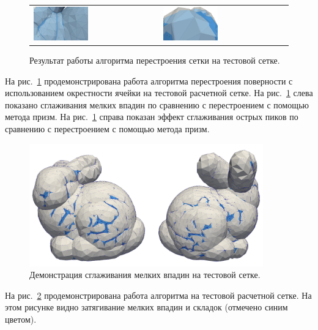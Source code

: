 \begin{figure}[ht]
\centering
\begin{tabular}{ll}
\includegraphics[width=0.45\textwidth]{./pics/text_1_remesh_common_envelope/pic_envelope_cave.png}
&
\includegraphics[width=0.45\textwidth]{./pics/text_1_remesh_common_envelope/pic_envelope_peak.png}
\end{tabular}
\singlespacing
{}\caption{Результат работы алгоритма перестроения сетки на тестовой сетке.}
\label{fig:text_1_remesh3_common_envelope_bunny}
\end{figure}

На рис.~\ref{fig:text_1_remesh3_common_envelope_bunny} продемонстрирована работа алгоритма перестроения поверности с использованием окрестности ячейки на тестовой расчетной сетке.
На рис.~\ref{fig:text_1_remesh3_common_envelope_bunny} слева показано сглаживания мелких впадин по сравнению с перестроением с помощью метода призм.
На рис.~\ref{fig:text_1_remesh3_common_envelope_bunny} справа показан эффект сглаживания острых пиков по сравнению с перестроением с помощью метода призм.

\begin{figure}[ht]
\centering
\includegraphics[width=0.9\textwidth]{./pics/text_1_remesh_common_envelope/bunny.png}
\singlespacing
{}\caption{Демонстрация сглаживания мелких впадин на тестовой сетке.}
\label{fig:text_1_remesh3_common_envelope_bunny2}
\end{figure}

На рис.~\ref{fig:text_1_remesh3_common_envelope_bunny2} продемонстрирована работа алгоритма на тестовой расчетной сетке.
На этом рисунке видно затягивание мелких впадин и складок (отмечено синим цветом).
